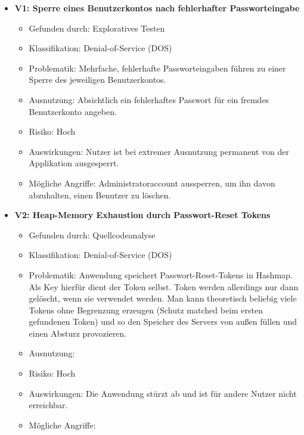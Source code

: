 \documentclass[12pt,DIV14,BCOR10mm,a4paper,parskip=half-,headsepline,headinclude,english,ngerman,bibliography=totocnumbered]{scrreprt}
\begin{document}
\begin{itemize}

  \hypertarget{vulnerability1}{}
  \item \textbf{V1: Sperre eines Benutzerkontos nach fehlerhafter Passworteingabe}
  \begin{itemize}
  \item Gefunden durch: Exploratives Testen
  \item Klassifikation: Denial-of-Service (DOS)
  \item Problematik: Mehrfache, fehlerhafte Passworteingaben führen zu einer Sperre des jeweiligen Benutzerkontos.
  \item Ausnutzung: Absichtlich ein fehlerhaftes Passwort für ein fremdes Benutzerkonto angeben.
  \item Risiko: Hoch
  \item Auswirkungen: Nutzer ist bei extremer Ausnutzung permanent von der Applikation ausgesperrt. 
  \item Mögliche Angriffe: Administratoraccount aussperren, um ihn davon abzuhalten, einen Benutzer zu löschen.
  \end{itemize}

  \hypertarget{vulnerability2}{}
  \item \textbf{V2: Heap-Memory Exhaustion durch Passwort-Reset Tokens}
  \begin{itemize}
  \item Gefunden durch: Quellcodeanalyse
  \item Klassifikation: Denial-of-Service (DOS)
  \item Problematik: Anwendung speichert Passwort-Reset-Tokens in Hashmap. Als Key hierfür dient der Token selbst. Token werden allerdings nur dann gelöscht, wenn sie verwendet werden. Man kann theoretisch beliebig viele Tokens ohne Begrenzung erzeugen (Schutz matched beim ersten gefundenen Token) und so den Speicher des Servers von außen füllen und einen Absturz provozieren.
  \item Ausnutzung: 
  \item Risiko: Hoch
  \item Auswirkungen: Die Anwendung stürzt ab und ist für andere Nutzer nicht erreichbar.
  \item Mögliche Angriffe: 
  \end{itemize}


\end{itemize}
\end{document}
